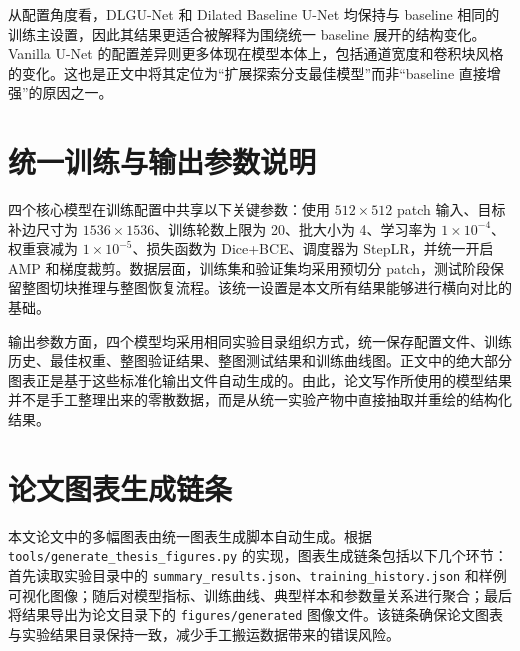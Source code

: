 \begin{table}[htbp]
\centering
\caption{核心模型配置差异汇总}
\label{tab:v2-config-summary}
\end{table}

从配置角度看，DLGU-Net 和 Dilated Baseline U-Net 均保持与 baseline 相同的训练主设置，因此其结果更适合被解释为围绕统一 baseline 展开的结构变化。Vanilla U-Net 的配置差异则更多体现在模型本体上，包括通道宽度和卷积块风格的变化。这也是正文中将其定位为“扩展探索分支最佳模型”而非“baseline 直接增强”的原因之一。

\section{统一训练与输出参数说明}
四个核心模型在训练配置中共享以下关键参数：使用 $512 \times 512$ patch 输入、目标补边尺寸为 $1536 \times 1536$、训练轮数上限为 20、批大小为 4、学习率为 $1\times10^{-4}$、权重衰减为 $1\times10^{-5}$、损失函数为 Dice+BCE、调度器为 StepLR，并统一开启 AMP 和梯度裁剪。数据层面，训练集和验证集均采用预切分 patch，测试阶段保留整图切块推理与整图恢复流程。该统一设置是本文所有结果能够进行横向对比的基础。

输出参数方面，四个模型均采用相同实验目录组织方式，统一保存配置文件、训练历史、最佳权重、整图验证结果、整图测试结果和训练曲线图。正文中的绝大部分图表正是基于这些标准化输出文件自动生成的。由此，论文写作所使用的模型结果并不是手工整理出来的零散数据，而是从统一实验产物中直接抽取并重绘的结构化结果。

\section{论文图表生成链条}
本文论文中的多幅图表由统一图表生成脚本自动生成。根据 \texttt{tools/generate\_thesis\_figures.py} 的实现，图表生成链条包括以下几个环节：首先读取实验目录中的 \texttt{summary\_results.json}、\texttt{training\_history.json} 和样例可视化图像；随后对模型指标、训练曲线、典型样本和参数量关系进行聚合；最后将结果导出为论文目录下的 \texttt{figures/generated} 图像文件。该链条确保论文图表与实验结果目录保持一致，减少手工搬运数据带来的错误风险。

